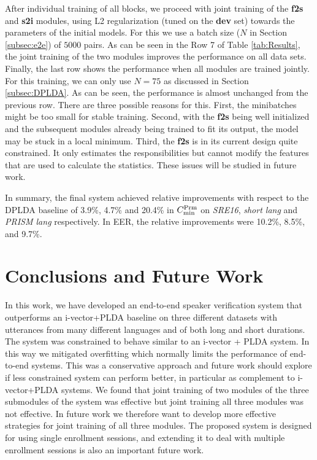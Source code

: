 \documentclass{article}
\begin{document}
After individual training of all blocks, we proceed with joint training of the {\bf f2s} and {\bf s2i} modules, using L2 regularization (tuned on the {\bf dev} set) towards the parameters of the initial models. For this we use a batch size ($N$ in Section \ref{subsec:e2e}) of $5000$ pairs. As can be seen in the Row 7 of Table \ref{tab:Results}, the joint training of the two modules improves the performance on all data sets. Finally, the last row shows the performance when all modules are trained jointly. For this training, we can only use $N=75$ as discussed in Section \ref{subsec:DPLDA}. As can be seen, the performance is almost unchanged from the previous row. There are three possible reasons for this. First, the minibatches might be too small for stable training. Second, with the {\bf f2s} being well initialized and the subsequent modules already being trained to fit its output, the model may be stuck in a local minimum. Third, the {\bf f2s} is in its current design quite constrained. It only estimates the responsibilities but cannot modify the features that are used to calculate the statistics. These issues will be studied in future work. 

In summary, the final system achieved relative improvements with respect to the DPLDA baseline of 3.9\%, 4.7\% and 20.4\% in $C^{\rm Prm}_{\rm min}$ on \emph{SRE16}, \emph{short lang} and \emph{PRISM lang} respectively. In EER, the relative improvements were 10.2\%, 8.5\%, and 9.7\%.


\section{Conclusions and Future Work}
\label{sec:concl}
In this work, we have developed an end-to-end speaker verification system that outperforms an i-vector+PLDA baseline on three different datasets with utterances from many different languages and of both long and short durations. The system was constrained to behave similar to an i-vector + PLDA system. In this way we mitigated overfitting which normally limits the performance of end-to-end systems. This was a conservative approach and future work should explore if less constrained system can perform better, in particular as complement to i-vector+PLDA systems.
We found that joint training of two modules of the three submodules of the system was effective but joint training all three modules was not effective. In future work we therefore want to develop more effective strategies for joint training of all three modules. The proposed system is designed for using single enrollment sessions, and extending it to deal with multiple enrollment sessions is also an important future work. 




\end{document}
